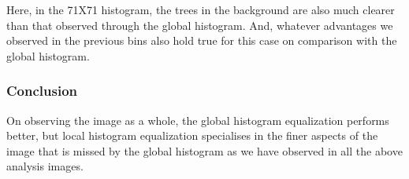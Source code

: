 \documentclass{article}
\begin{document}
Here, in the 71X71 histogram, the trees in the background are also much clearer than that observed through the global histogram. And, whatever advantages we observed in the previous bins also hold true for this case on comparison with the global histogram.

\subsubsection*{Conclusion}

On observing the image as a whole, the global histogram equalization performs better, but local histogram equalization specialises in the finer aspects of the image that is missed by the global histogram as we have observed in all the above analysis images.
\end{document}
